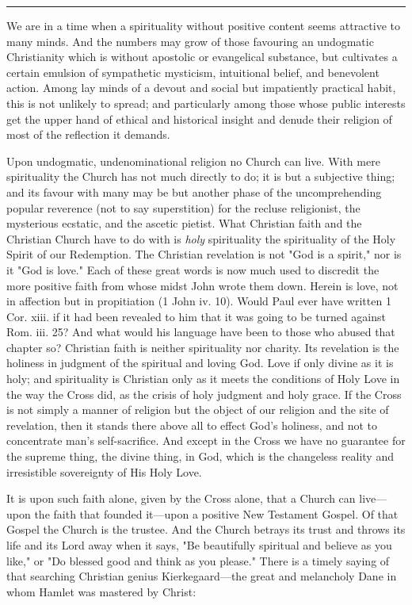 \documentclass[draft]{ptfdoc}
\begin{document}
\rule{4cm}{0.4pt}

We are in a time when a spirituality without 
positive content seems attractive to many minds. 
And the numbers may grow of those favouring 
an undogmatic Christianity which is without 
apostolic or evangelical substance, but cultivates 
a certain emulsion of sympathetic mysticism, 
intuitional belief, and benevolent action. Among 
lay minds of a devout and social but impatiently 
practical habit, this is not unlikely to spread; 
and particularly among those whose public interests 
get the upper hand of ethical and 
historical insight and denude their religion of 
most of the reflection it demands. 

Upon undogmatic, undenominational religion 
no Church can live. With mere spirituality the 
Church has not much directly to do; it is but 
a subjective thing; and its favour with many 
may be but another phase of the uncomprehending 
popular reverence (not to say superstition) 
for the recluse religionist, the mysterious 
ecstatic, and the ascetic pietist. What Christian 
faith and the Christian Church have to do with 
is \textit{holy} spirituality the spirituality of the Holy 
Spirit of our Redemption. The Christian revelation 
is not "God is a spirit," nor is it "God 
is love." Each of these great words is now 
much used to discredit the more positive faith 
from whose midst John wrote them down. 
Herein is love, not in affection but in propitiation 
(1 John iv. 10). Would Paul ever 
have written 1 Cor. xiii. if it had been revealed 
to him that it was going to be turned against 
Rom. iii. 25? And what would his language 
have been to those who abused that chapter 
so? Christian faith is neither spirituality nor 
charity. Its revelation is the holiness in judgment 
of the spiritual and loving God. Love 
if only divine as it is holy; and spirituality is 
Christian only as it meets the conditions of 
Holy Love in the way the Cross did, as the 
crisis of holy judgment and holy grace. If 
the Cross is not simply a manner of religion 
but the object of our religion and the site 
of revelation, then it stands there above all 
to effect God's holiness, and not to concentrate 
man's self-sacrifice. And except in the 
Cross we have no guarantee for the supreme 
thing, the divine thing, in God, which is the 
changeless reality and irresistible sovereignty 
of His Holy Love. 

It is upon such faith alone, given by the Cross 
alone, that a Church can live---upon the faith 
that founded it---upon a positive New Testament 
Gospel. Of that Gospel the Church is 
the trustee. And the Church betrays its trust 
and throws its life and its Lord away when it 
says, "Be beautifully spiritual and believe as 
you like," or "Do blessed good and think as you 
please." 
There is a timely saying of that searching 
Christian genius Kierkegaard---the great and 
melancholy Dane in whom Hamlet was mastered 
by Christ: 
\end{document}
